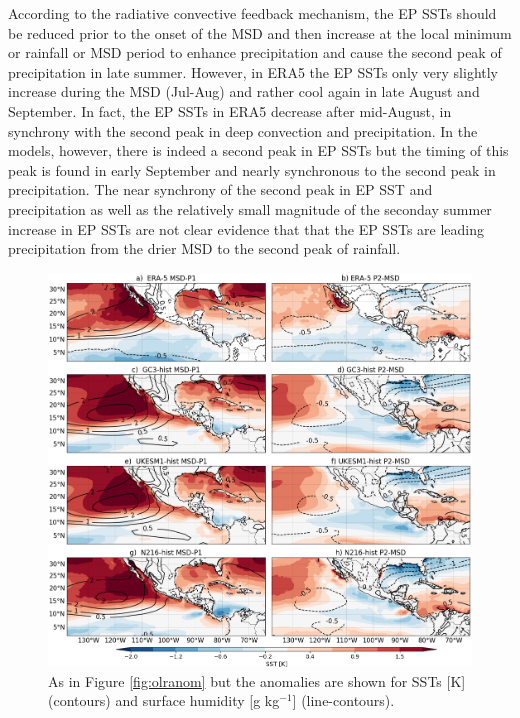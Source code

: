 According to the radiative convective feedback mechanism, the EP SSTs should be reduced prior to the onset of the MSD and then increase at the local minimum or rainfall or MSD period to enhance precipitation and cause the second peak of precipitation in late summer. However, in ERA5 the EP SSTs only very slightly increase during the MSD (Jul-Aug) and rather cool again in late August and September. In fact, the EP SSTs in ERA5 decrease after mid-August, in synchrony with the second peak in deep convection and precipitation. 
 In the models, however, there is indeed a second peak in EP SSTs but the timing of this peak is found in early September and nearly synchronous to the second peak in precipitation. The near synchrony of the second peak in EP SST and precipitation as well as the relatively small magnitude of the seconday summer increase in EP SSTs are not clear evidence that that the EP SSTs are leading precipitation from the drier MSD to the second peak of rainfall. 
 
 




\begin{figure}[t!]
\includegraphics[width=\linewidth]{figures/fig4_sstv_3.png}
\caption[Composite SST anomalies]{As in Figure \ref{fig:olranom} but the anomalies are shown for SSTs [K] (contours) and surface humidity [g kg$^{-1}$] (line-contours).  }
\label{fig:msdsstanom}
\end{figure}

